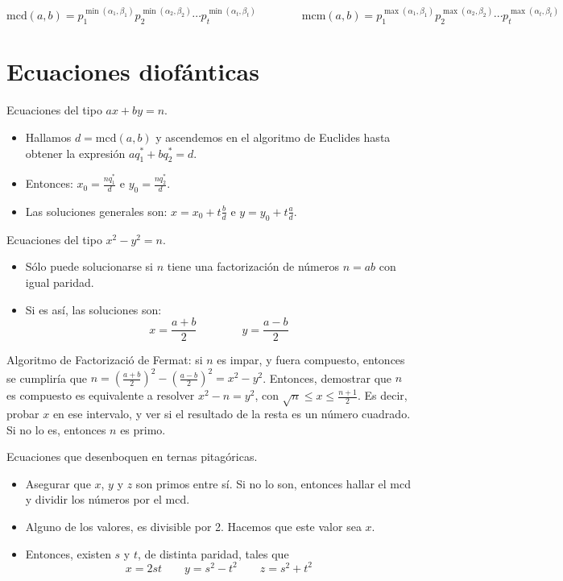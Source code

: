 \documentclass[a4paper]{article}
\begin{document}
$$\text{mcd}(a,b) = p_1^{\min(\alpha_1,\beta_1)}p_2^{\min(\alpha_2,\beta_2)}\cdots p_t^{\min(\alpha_t,\beta_t)}\qquad \qquad \text{mcm}(a,b) = p_1^{\max(\alpha_1,\beta_1)}p_2^{\max(\alpha_2,\beta_2)}\cdots p_t^{\max(\alpha_t,\beta_t)}$$
	
\hrulefill

\section*{Ecuaciones diofánticas}
Ecuaciones del tipo $ax+by=n$.
\begin{itemize}
	\item Hallamos $d=\text{mcd}(a,b)$ y ascendemos en el algoritmo de Euclides hasta obtener la expresión $aq_1^*+ bq_2^*=d$.
	\item Entonces: $x_0=\frac{nq_1^*}{d}$ e $y_0 = \frac{nq_2^*}{d}$.
	\item Las soluciones generales son: $x = x_0+t\frac{b}{d}$ e $y=y_0+t\frac{a}{d}$.
\end{itemize}

Ecuaciones del tipo $x^2-y^2=n$. 
\begin{itemize}
	\item Sólo puede solucionarse si $n$ tiene una factorización de números $n=ab$ con igual paridad.
	\item Si es así, las soluciones son:
	$$x = \frac{a+b}{2} \qquad\qquad y = \frac{a-b}{2}$$
\end{itemize}

Algoritmo de Factorizació de Fermat: si $n$ es impar, y fuera compuesto, entonces se cumpliría que $n = \left(\frac{a+b}{2}\right)^2 - \left(\frac{a-b}{2}\right)^2 = x^2-y^2$. Entonces, demostrar que $n$ es compuesto es equivalente a resolver $x^2-n=y^2$, con $\sqrt{n}\le x \le \frac{n+1}{2}$. Es decir, probar $x$ en ese intervalo, y ver si el resultado de la resta es un número cuadrado. Si no lo es, entonces $n$ es primo.

Ecuaciones que desenboquen en ternas pitagóricas.
\begin{itemize}
	\item Asegurar que $x$, $y$ y $z$ son primos entre sí. Si no lo son, entonces hallar el mcd y dividir los números por el mcd.
	\item Alguno de los valores, es divisible por 2. Hacemos que este valor sea $x$.
	\item Entonces, existen $s$ y $t$, de distinta paridad, tales que
	$$x = 2st \qquad y = s^2-t^2 \qquad z=s^2+t^2$$
\end{itemize}
\end{document}
